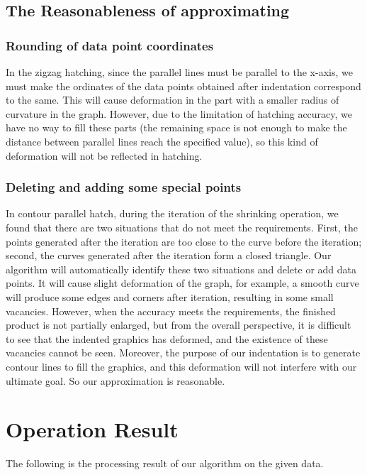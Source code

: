\documentclass{apmcmthesis}
\begin{document}
\subsection{The Reasonableness of approximating}


\subsubsection{Rounding of data point coordinates}
In the zigzag hatching, since the parallel lines must be parallel to the x-axis, we must make the ordinates of the data points obtained after indentation correspond to the same. This will cause deformation in the part with a smaller radius of curvature in the graph. However, due to the limitation of hatching accuracy, we have no way to fill these parts (the remaining space is not enough to make the distance between parallel lines reach the specified value), so this kind of deformation will not be reflected in hatching.

\subsubsection{Deleting and adding some special points}
In contour parallel hatch, during the iteration of the shrinking operation, we found that there are two situations that do not meet the requirements. First, the points generated after the iteration are too close to the curve before the iteration; second, the curves generated after the iteration form a closed triangle. Our algorithm will automatically identify these two situations and delete or add data points. It will cause slight deformation of the graph, for example, a smooth curve will produce some edges and corners after iteration, resulting in some small vacancies. However, when the accuracy meets the requirements, the finished product is not partially enlarged, but from the overall perspective, it is difficult to see that the indented graphics has deformed, and the existence of these vacancies cannot be seen. Moreover, the purpose of our indentation is to generate contour lines to fill the graphics, and this deformation will not interfere with our ultimate goal. So our approximation is reasonable.




\section{Operation Result}
The following is the processing result of our algorithm on the given data.
\end{document}
